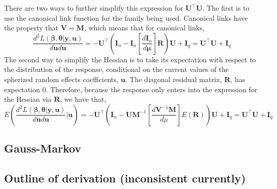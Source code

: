 \documentclass{jss}
\begin{document}
There are two ways to further simplify this expression for $\bm U^\top
\bm U$. The first is to use the canonical link function for the family
being used. Canonical links have the property that $\bm V = \bm M$,
which means that for canonical links,
\begin{equation}
  \frac{d^2 L(\bm\beta, \bm\theta | \bm y, \bm u)}{d \bm u d \bm u} = 
  -\bm U^\top\left( 
    \bm I_n - 
    \bm I_n \left[ \frac{d \bm I_n}{d \bm\mu} \right] \bm R
  \right) \bm U + \bm I_q = \bm U^\top \bm U + \bm I_q
\end{equation}
The second way to simplify the Hessian is to take its expectation with
respect to the distribution of the response, conditional on the
current values of the spherized random effects coefficients, $\bm
u$. The diagonal residual matrix, $\bm R$, has expectation
0. Therefore, because the response only enters into the expression for
the Hessian via $\bm R$, we have that,
\begin{equation}
  E\left(\frac{d^2 L(\bm\beta, \bm\theta | \bm y, \bm u)}{d \bm u d \bm
      u} | \bm u \right) = 
  -\bm U^\top\left( 
    \bm I_n - 
    \bm U \bm M^{-1}\left[ \frac{d \bm V^{-1}\bm M}{d\mu} \right] E(\bm R)
  \right) \bm U + \bm I_q = \bm U^\top \bm U + \bm I_q
\label{eq:betaHessian}
\end{equation}

\subsection{Gauss-Markov}

\subsection{Outline of derivation (inconsistent currently)}
\end{document}
